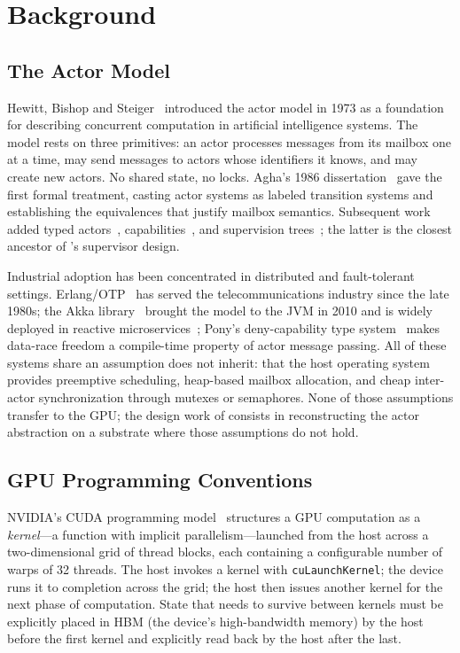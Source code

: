 \section{Background}
\label{sec:background}

\subsection{The Actor Model}
\label{sec:bg:actor}

Hewitt, Bishop and Steiger~\citep{hewitt1973actors} introduced the
actor model in 1973 as a foundation for describing concurrent
computation in artificial intelligence systems.  The model rests on
three primitives: an actor processes messages from its mailbox one
at a time, may send messages to actors whose identifiers it knows,
and may create new actors.  No shared state, no locks.  Agha's
1986 dissertation~\citep{agha1986actors} gave the first formal
treatment, casting actor systems as labeled transition systems and
establishing the equivalences that justify mailbox semantics.
Subsequent work added typed actors~\citep{he2014typed},
capabilities~\citep{clebsch2015pony}, and supervision
trees~\citep{armstrong2007erlang}; the latter is the closest
ancestor of \system{}'s supervisor design.

Industrial adoption has been concentrated in distributed and
fault-tolerant settings.  Erlang/OTP~\citep{armstrong2007erlang} has
served the telecommunications industry since the late 1980s; the
Akka library~\citep{akka2010} brought the model to the JVM in 2010
and is widely deployed in reactive
microservices~\citep{vernon2015reactive}; Pony's deny-capability
type system~\citep{clebsch2015pony} makes data-race freedom a
compile-time property of actor message passing.  All of these
systems share an assumption \system{} does not inherit: that the
host operating system provides preemptive scheduling, heap-based
mailbox allocation, and cheap inter-actor synchronization through
mutexes or semaphores.  None of those assumptions transfer to the
GPU; the design work of \system{} consists in reconstructing the
actor abstraction on a substrate where those assumptions do not
hold.

\subsection{GPU Programming Conventions}
\label{sec:bg:gpu}

NVIDIA's CUDA programming model~\citep{nickolls2008cuda} structures a
GPU computation as a \emph{kernel}—a function with implicit
parallelism—launched from the host across a two-dimensional grid of
thread blocks, each containing a configurable number of warps of 32
threads.  The host invokes a kernel with
\texttt{cuLaunchKernel}; the device runs it to completion across the
grid; the host then issues another kernel for the next phase of
computation.  State that needs to survive between kernels must be
explicitly placed in HBM (the device's high-bandwidth memory) by
the host before the first kernel and explicitly read back by the
host after the last.

